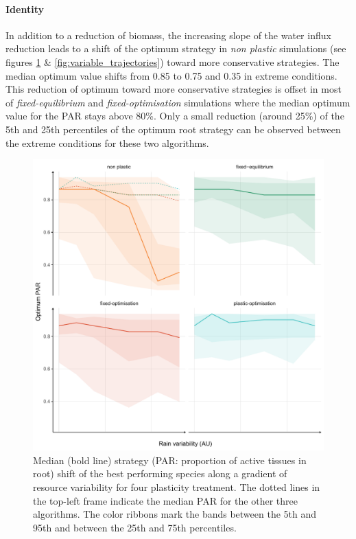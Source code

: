 \paragraph{Identity}

In addition to a reduction of biomass, the increasing slope of the water influx reduction leads to a shift of the optimum strategy in \textit{non plastic} simulations (see figures \ref{fig:variable_strategy} \&  \ref{fig:variable_trajectories}) toward more conservative strategies. The median optimum value shifts from 0.85 to 0.75 and 0.35 in extreme conditions. This reduction of optimum toward more conservative strategies is offset in most of \textit{fixed-equilibrium} and \textit{fixed-optimisation} simulations where the median optimum value for the PAR stays above 80\%. Only a small reduction (around 25\%) of the 5th and 25th percentiles of the optimum root strategy can be observed between the extreme conditions for these two algorithms.

\begin{figure}\label{fig:variable_strategy}
\includegraphics[width = \textwidth]{./2_PP/Figures/Variable/var_strat_trend.pdf}
\caption[Strategy shift along a gradient of resource variability]{Median (bold line) strategy (PAR: proportion of active tissues in root) shift of the best performing species along a gradient of resource variability for four plasticity treatment. The dotted lines in the top-left frame indicate the median PAR for the other three algorithms. The color ribbons mark the bands between the 5th and 95th and between the 25th and 75th percentiles.}
\end{figure}

